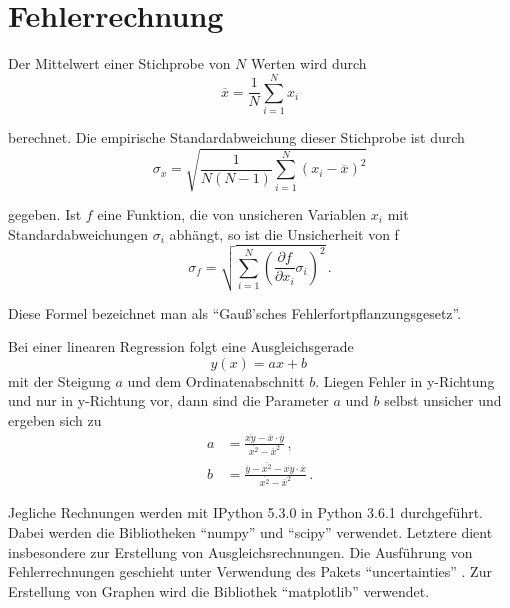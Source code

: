 \newpage
\section{Fehlerrechnung}
\label{sec:Fehlerrechnung}
Der Mittelwert einer Stichprobe von $N$ Werten wird durch
\begin{equation}
  \overline{x} = \frac{1}{N} \sum\limits_{i = 1}^N x_i
  \label{eqn:mean}
\end{equation}

berechnet.
Die empirische Standardabweichung dieser Stichprobe ist durch
\begin{equation}
  \sigma_x = \sqrt{\frac{1}{N(N-1)}
    \sum\limits_{i = 1}^N
    (x_i-\overline{x})^2}
    \label{eqn:std}
\end{equation}

gegeben.
Ist $f$ eine Funktion, die von unsicheren Variablen $x_i$ mit
Standardabweichungen $\sigma_i$ abhängt, so ist die Unsicherheit von f
\begin{equation}
  \sigma_f = \sqrt{
    \sum\limits_{i = 1}^N
      \left( \frac{\partial f}{\partial x_i} \sigma_i \right)^{\!\! 2}
  }\,.
  \label{eqn:gaussfehler}
\end{equation}

Diese Formel bezeichnet man als \enquote{Gauß'sches Fehlerfortpflanzungsgesetz}.

Bei einer linearen Regression folgt eine Ausgleichsgerade
\begin{equation}
  y(x) = ax+b\,
  \label{eqn:ausgleichsgerade}
\end{equation}
mit der Steigung $a$ und dem Ordinatenabschnitt $b$. Liegen Fehler in y-Richtung
und nur in y-Richtung vor, dann sind die Parameter $a$ und $b$ selbst unsicher
und ergeben sich zu
\begin{align}
  a &= \frac{\overline{xy}-\overline{x} \cdot \overline{y}}{\overline{x^2}-\overline{x}^2}\,,\\
  b &= \frac{\overline{y}-\overline{x^2}-\overline{xy} \cdot \overline{x}}{\overline{x^2}-\overline{x}^2}\,.
\end{align}

Jegliche Rechnungen werden mit IPython 5.3.0 in Python 3.6.1 durchgeführt. Dabei
werden die Bibliotheken \enquote{numpy} \cite{numpy} und \enquote{scipy} \cite{scipy} verwendet.
Letztere dient insbesondere zur Erstellung von Ausgleichsrechnungen.
Die Ausführung von Fehlerrechnungen geschieht unter Verwendung des Pakets
\enquote{uncertainties} \cite{uncertainties}. Zur Erstellung von Graphen wird die Bibliothek
\enquote{matplotlib} \cite{matplotlib} verwendet.
